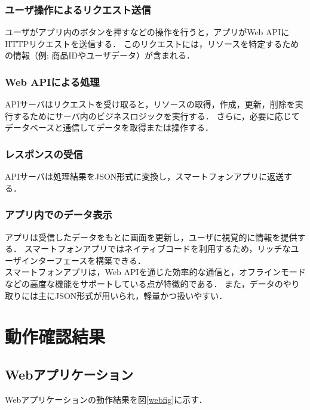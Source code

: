 \documentclass[titlepage,a4paper]{jsarticle}
\begin{document}
\subsubsection{ユーザ操作によるリクエスト送信}
ユーザがアプリ内のボタンを押すなどの操作を行うと，アプリがWeb APIにHTTPリクエストを送信する．
このリクエストには，リソースを特定するための情報（例: 商品IDやユーザデータ）が含まれる．

\subsubsection{Web APIによる処理}
APIサーバはリクエストを受け取ると，リソースの取得，作成，更新，削除を実行するためにサーバ内のビジネスロジックを実行する．
さらに，必要に応じてデータベースと通信してデータを取得または操作する．

\subsubsection{レスポンスの受信}
APIサーバは処理結果をJSON形式に変換し，スマートフォンアプリに返送する．

\subsubsection{アプリ内でのデータ表示}
アプリは受信したデータをもとに画面を更新し，ユーザに視覚的に情報を提供する．
スマートフォンアプリではネイティブコードを利用するため，リッチなユーザインターフェースを構築できる．\\

スマートフォンアプリは，Web APIを通じた効率的な通信と，オフラインモードなどの高度な機能をサポートしている点が特徴的である．
また，データのやり取りには主にJSON形式が用いられ，軽量かつ扱いやすい．

\section{動作確認結果}
\subsection{Webアプリケーション}
Webアプリケーションの動作結果を図\ref{webfig}に示す．
\end{document}
